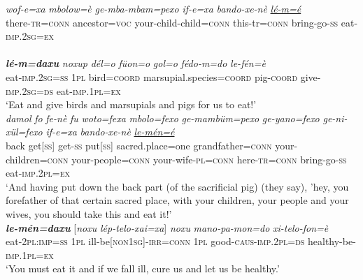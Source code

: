 \documentclass[output=paper]{LSP/langsci}
\begin{document}
\begin{exe}
\ex \label{Devex:07ae}
\begin{xlist}
\ex \label{Devex:07a}						
\gll \textit{wof-e=xa} \textit{mbolow=è}  \textit{ge-mba-mbam=pexo} \textit{if-e=xa} \textit{bando-xe-nè} \textit{\underline{lé-m=é}}\\
there-\textsc{tr=conn} ancestor=\textsc{voc} your-child-child=\textsc{conn} this-tr=\textsc{conn}   bring-go-\textsc{ss} eat-\textsc{imp.2sg=ex}\\
\glt {}\\

\ex \label{Devex:07b}						
\gll \textbf{\textit{lé-m=daxu}} \textit{noxup} \textit{dél=o} \textit{füon=o} \textit{gol=o} \textit{fédo-m=do} \textit{le-fén=è}\\
eat-\textsc{imp.2sg=ss} \textsc{1pl} bird=\textsc{coord} marsupial.species=\textsc{coord} pig-\textsc{coord} give-\textsc{imp.2sg=ds} eat-\textsc{imp.1pl=ex}\\
\glt `Eat and give birds and marsupials and pigs for us to eat!'\\ 

\ex \label{Devex:07c}						
\gll \textit{damol} \textit{fo} \textit{fe-nè} \textit{fu} \textit{woto=fexa} \textit{mbolo=fexo} \textit{ge-mambüm=pexo} 	\textit{ge-yano=fexo} \textit{ge-ni-xül=fexo} \textit{if-e=xa} \textit{bando-xe-nè} \textit{\underline{le-mén=é}}\\
back get[\textsc{ss}] get-\textsc{ss} put[\textsc{ss}] sacred.place=one grandfather\textsc{=conn} 	your-children=\textsc{conn} your-people=\textsc{conn} your-wife-\textsc{pl=conn} here-\textsc{tr=conn} bring-go-\textsc{ss} eat-\textsc{imp.2pl=ex}\\
\glt `And having put down the back part (of the sacrificial pig) (they say), 'hey, you forefather of that certain sacred place, with your children, your people and your wives, you should take this and eat it!'\\

\ex \label{Devex:07d}						
\gll \textbf{\textit{le-mén=daxu}} [\textit{noxu}  \textit{lép-telo-xai=xa}] \textit{noxu} \textit{mano-pa-mon=do} \textit{xi-telo-fon=è}\\
eat-\textsc{2pl:imp=ss} \textsc{1pl} ill-be\textsc{[non1sg]-irr=conn} \textsc{1pl} good-\textsc{caus-imp.2pl=ds} healthy-be-\textsc{imp.1pl=ex}\\
\glt `You must eat it and if we fall ill, cure us and let us be healthy.' \citep[][159--162]{enk97}

\end{xlist}
\end{exe}
\end{document}
